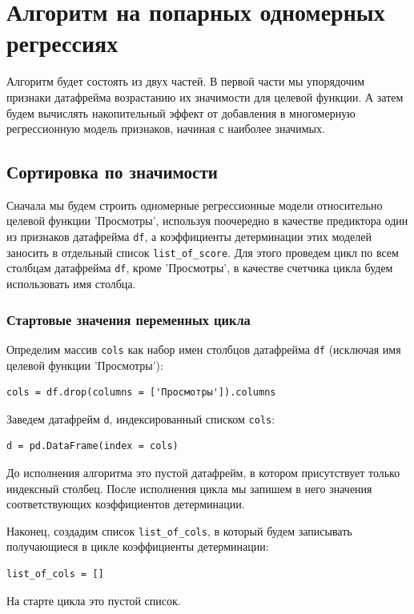 \documentclass[a4paper,12pt]{article}
\begin{document}
\section{Алгоритм на попарных одномерных\\ регрессиях}


Алгоритм будет состоять из двух частей. В первой части мы упорядочим признаки датафрейма возрастанию их значимости для целевой функции. А затем будем вычислять накопительный эффект от добавления в многомерную регрессионную модель признаков, начиная с наиболее значимых.


\subsection{Сортировка по значимости }

Сначала мы будем строить одномерные регрессионные модели относительно целевой функции 'Просмотры', используя поочередно в качестве предиктора один из признаков датафрейма \texttt{df}, а коэффициенты детерминации этих моделей заносить в отдельный список \texttt{list\_of\_score}. Для этого проведем цикл по всем столбцам датафрейма \texttt{df}, кроме  'Просмотры', в качестве счетчика цикла будем использовать имя столбца.

\subsubsection{Стартовые значения переменных цикла}

Определим массив \texttt{cols} как набор имен столбцов датафрейма \texttt{df} (исключая имя целевой функции 'Просмотры'):
\begin{verbatim}
cols = df.drop(columns = ['Просмотры']).columns
\end{verbatim}
Заведем датафрейм \texttt{d}, индексированный списком \texttt{cols}:
\begin{verbatim}
d = pd.DataFrame(index = cols)
\end{verbatim}
До исполнения алгоритма это пустой датафрейм, в котором присутствует только индексный столбец. После исполнения цикла мы запишем в него значения соответствующих коэффициентов детерминации.

Наконец, создадим список \texttt{list\_of\_cols}, в который будем записывать получающиеся в цикле коэффициенты детерминации:
\begin{verbatim}
list_of_cols = []
\end{verbatim}
На старте цикла это пустой список.
\end{document}
